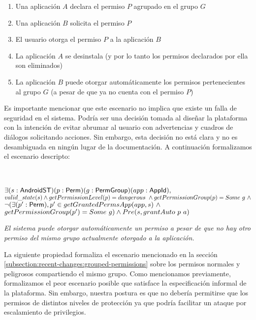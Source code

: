 \begin{enumerate}
    \item Una aplicación $A$ declara el permiso $P$ agrupado en el grupo $G$
    \item Una aplicación $B$ solicita el permiso $P$
    \item El usuario otorga el permiso $P$ a la aplicación $B$
    \item La aplicación $A$ se desinstala (y por lo tanto los permisos declarados por ella son eliminados)
    \item La aplicación $B$ puede otorgar automáticamente los permisos pertenecientes al grupo $G$ (a
          pesar de que ya no cuenta con el permiso $P$)
\end{enumerate}

Es importante mencionar que este escenario no implica que existe un falla de seguridad en el sistema.
Podría ser una decisión tomada al diseñar la plataforma con la intención de evitar abrumar al usuario
con advertencias y cuadros de diálogos solicitando acciones. Sin embargo, esta decisión no está clara
y no es desambiguada en ningún lugar de la documentación. A continuación formalizamos el
escenario descripto:

\begin{prop} \label{section:formalization:property2}
    \mbox{} \\ \\
    $\exists (s:\mathsf{AndroidST}) (p:\mathsf{Perm}) (g:\mathsf{PermGroup}) (app:\mathsf{AppId}),$
    $valid\_state(s) \land \\
        getPermissionLevel(p) = dangerous~ \land
        getPermissionGroup(p) = Some\ g\ \land$
    $\neg (\exists (p': \mathsf{Perm}), p' \in getGrantedPermsApp(app,s)~ \land$ \\
    $ getPermissionGroup(p') = Some\ g) \land Pre(s, grantAuto~p~a) \\ \\$

    \textit{El sistema puede otorgar automáticamente un permiso a pesar de que no hay otro permiso del mismo grupo actualmente otorgado a la aplicación.}
\end{prop}


La siguiente propiedad formaliza el escenario mencionado en la sección
\ref{subsection:recent-changes:grouped-permissions} sobre los permisos normales y peligrosos
compartiendo el  mismo grupo. Como mencionamos previamente, formalizamos el peor escenario posible que
satisface la especificación informal de la plataforma. Sin embargo, nuestra postura es que no debería
permitirse que los permisos de distintos niveles de protección ya que podría facilitar un ataque por
escalamiento de privilegios.

